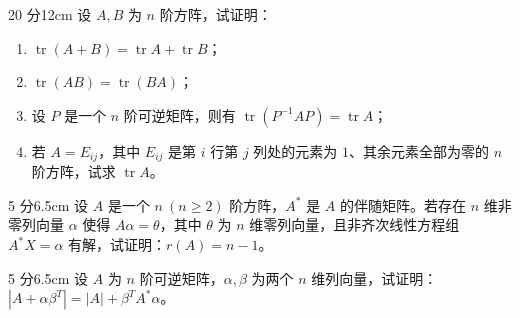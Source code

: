 \begin{problem}{20 分}{12cm}
设 $A,B$ 为 $n$ 阶方阵，试证明：
\begin{enumerate}[label=(\arabic*),leftmargin=2.2em,itemsep=0.25em,topsep=0.3em]
  \item $\operatorname{tr}(A+B)=\operatorname{tr}A+\operatorname{tr}B$；
  \item $\operatorname{tr}(AB)=\operatorname{tr}(BA)$；
  \item 设 $P$ 是一个 $n$ 阶可逆矩阵，则有 $\operatorname{tr}(P^{-1}AP)=\operatorname{tr}A$；
  \item 若 $A=E_{ij}$，其中 $E_{ij}$ 是第 $i$ 行第 $j$ 列处的元素为 $1$、其余元素全部为零的 $n$ 阶方阵，试求 $\operatorname{tr}A$。
\end{enumerate}
\end{problem}

\begin{problem}{5 分}{6.5cm}
设 $A$ 是一个 $n\ (n\ge 2)$ 阶方阵，$A^{*}$ 是 $A$ 的伴随矩阵。若存在 $n$ 维非零列向量 $\alpha$ 使得 $A\alpha=\theta$，其中 $\theta$ 为 $n$ 维零列向量，且非齐次线性方程组 $A^{*}X=\alpha$ 有解，试证明：$r(A)=n-1$。
\end{problem}

\begin{problem}{5 分}{6.5cm}
设 $A$ 为 $n$ 阶可逆矩阵，$\alpha,\beta$ 为两个 $n$ 维列向量，试证明：$|A+\alpha\beta^{T}|=|A|+\beta^{T}A^{*}\alpha$。
\end{problem}

